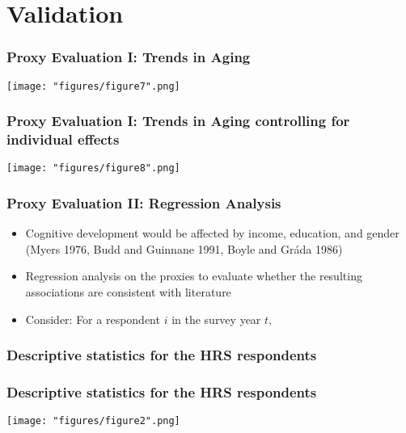 \documentclass[10pt,svgnames,fragile]{beamer}
\begin{document}
{
	\AtBeginSection{}
\section{Validation}
\begin{frame}
	\frametitle{Proxy Evaluation I: Trends in Aging} 
	\begin{center}
	\texttt{[image: "figures/figure7".png]}
\end{center}
\end{frame}

{
\begin{frame}
	\frametitle{Proxy Evaluation I: Trends in Aging controlling for individual effects} 
	\begin{center}
		\texttt{[image: "figures/figure8".png]}
	\end{center}
\end{frame}}

\begin{frame}
	\frametitle{Proxy Evaluation II: Regression Analysis} 
	\begin{itemize}
		\item Cognitive development would be affected by income, education, and gender \\(Myers 1976, Budd and Guinnane 1991, Boyle and Gr{\'a}da 1986)
		\item Regression analysis on the proxies to evaluate whether the resulting associations are consistent with literature
		\item Consider: For a respondent $i$ in the survey year $t$,
	\end{itemize}
\end{frame}

}




\begin{frame}[label = table1]
	\frametitle{Descriptive statistics for the HRS respondents} 
	
	\hyperlink{data1}{}
\end{frame}


\begin{frame}[label = figure1]
	\frametitle{Descriptive statistics for the HRS respondents} 
	\begin{center}
	\texttt{[image: "figures/figure2".png]}
	\end{center}
	\hyperlink{Motivation}{}
\end{frame}
\end{document}
